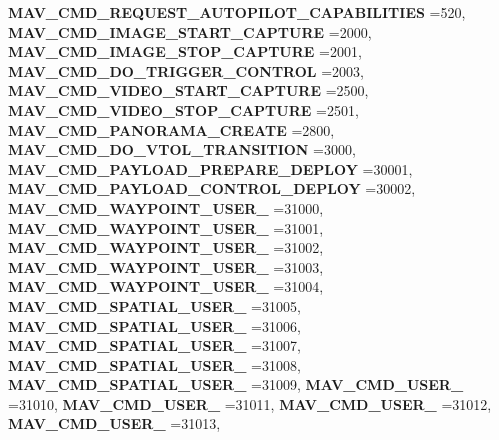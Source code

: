 \begin{DoxyCompactItemize}
\textbf{ M\+A\+V\+\_\+\+C\+M\+D\+\_\+\+R\+E\+Q\+U\+E\+S\+T\+\_\+\+A\+U\+T\+O\+P\+I\+L\+O\+T\+\_\+\+C\+A\+P\+A\+B\+I\+L\+I\+T\+I\+ES} =520, 
\newline
\textbf{ M\+A\+V\+\_\+\+C\+M\+D\+\_\+\+I\+M\+A\+G\+E\+\_\+\+S\+T\+A\+R\+T\+\_\+\+C\+A\+P\+T\+U\+RE} =2000, 
\textbf{ M\+A\+V\+\_\+\+C\+M\+D\+\_\+\+I\+M\+A\+G\+E\+\_\+\+S\+T\+O\+P\+\_\+\+C\+A\+P\+T\+U\+RE} =2001, 
\textbf{ M\+A\+V\+\_\+\+C\+M\+D\+\_\+\+D\+O\+\_\+\+T\+R\+I\+G\+G\+E\+R\+\_\+\+C\+O\+N\+T\+R\+OL} =2003, 
\textbf{ M\+A\+V\+\_\+\+C\+M\+D\+\_\+\+V\+I\+D\+E\+O\+\_\+\+S\+T\+A\+R\+T\+\_\+\+C\+A\+P\+T\+U\+RE} =2500, 
\newline
\textbf{ M\+A\+V\+\_\+\+C\+M\+D\+\_\+\+V\+I\+D\+E\+O\+\_\+\+S\+T\+O\+P\+\_\+\+C\+A\+P\+T\+U\+RE} =2501, 
\textbf{ M\+A\+V\+\_\+\+C\+M\+D\+\_\+\+P\+A\+N\+O\+R\+A\+M\+A\+\_\+\+C\+R\+E\+A\+TE} =2800, 
\textbf{ M\+A\+V\+\_\+\+C\+M\+D\+\_\+\+D\+O\+\_\+\+V\+T\+O\+L\+\_\+\+T\+R\+A\+N\+S\+I\+T\+I\+ON} =3000, 
\textbf{ M\+A\+V\+\_\+\+C\+M\+D\+\_\+\+P\+A\+Y\+L\+O\+A\+D\+\_\+\+P\+R\+E\+P\+A\+R\+E\+\_\+\+D\+E\+P\+L\+OY} =30001, 
\newline
\textbf{ M\+A\+V\+\_\+\+C\+M\+D\+\_\+\+P\+A\+Y\+L\+O\+A\+D\+\_\+\+C\+O\+N\+T\+R\+O\+L\+\_\+\+D\+E\+P\+L\+OY} =30002, 
\textbf{ M\+A\+V\+\_\+\+C\+M\+D\+\_\+\+W\+A\+Y\+P\+O\+I\+N\+T\+\_\+\+U\+S\+E\+R\+\_} =31000, 
\textbf{ M\+A\+V\+\_\+\+C\+M\+D\+\_\+\+W\+A\+Y\+P\+O\+I\+N\+T\+\_\+\+U\+S\+E\+R\+\_} =31001, 
\textbf{ M\+A\+V\+\_\+\+C\+M\+D\+\_\+\+W\+A\+Y\+P\+O\+I\+N\+T\+\_\+\+U\+S\+E\+R\+\_} =31002, 
\newline
\textbf{ M\+A\+V\+\_\+\+C\+M\+D\+\_\+\+W\+A\+Y\+P\+O\+I\+N\+T\+\_\+\+U\+S\+E\+R\+\_} =31003, 
\textbf{ M\+A\+V\+\_\+\+C\+M\+D\+\_\+\+W\+A\+Y\+P\+O\+I\+N\+T\+\_\+\+U\+S\+E\+R\+\_} =31004, 
\textbf{ M\+A\+V\+\_\+\+C\+M\+D\+\_\+\+S\+P\+A\+T\+I\+A\+L\+\_\+\+U\+S\+E\+R\+\_} =31005, 
\textbf{ M\+A\+V\+\_\+\+C\+M\+D\+\_\+\+S\+P\+A\+T\+I\+A\+L\+\_\+\+U\+S\+E\+R\+\_} =31006, 
\newline
\textbf{ M\+A\+V\+\_\+\+C\+M\+D\+\_\+\+S\+P\+A\+T\+I\+A\+L\+\_\+\+U\+S\+E\+R\+\_} =31007, 
\textbf{ M\+A\+V\+\_\+\+C\+M\+D\+\_\+\+S\+P\+A\+T\+I\+A\+L\+\_\+\+U\+S\+E\+R\+\_} =31008, 
\textbf{ M\+A\+V\+\_\+\+C\+M\+D\+\_\+\+S\+P\+A\+T\+I\+A\+L\+\_\+\+U\+S\+E\+R\+\_} =31009, 
\textbf{ M\+A\+V\+\_\+\+C\+M\+D\+\_\+\+U\+S\+E\+R\+\_} =31010, 
\newline
\textbf{ M\+A\+V\+\_\+\+C\+M\+D\+\_\+\+U\+S\+E\+R\+\_} =31011, 
\textbf{ M\+A\+V\+\_\+\+C\+M\+D\+\_\+\+U\+S\+E\+R\+\_} =31012, 
\textbf{ M\+A\+V\+\_\+\+C\+M\+D\+\_\+\+U\+S\+E\+R\+\_} =31013, 

\end{DoxyCompactItemize}
